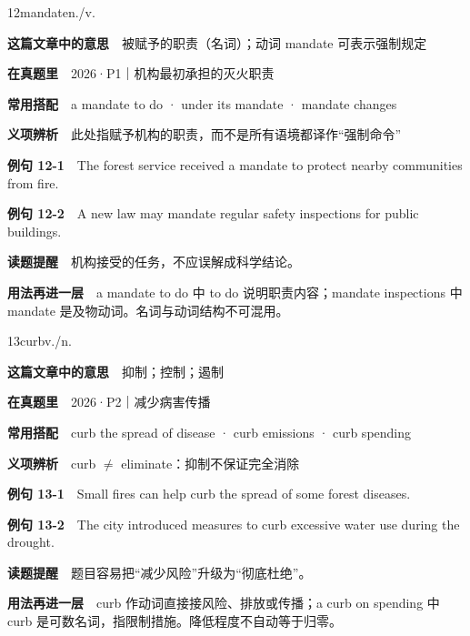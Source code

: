 \documentclass[a4paper,11pt,openany]{report}
\newcommand{\emphasislabel}[1]{\textcolor{leaf}{\CJKsf\bfseries #1}}
\begin{document}
\begin{vocabbox}{12}{mandate}{n./v.}

\textbf{这篇文章中的意思}　被赋予的职责（名词）；动词 mandate 可表示强制规定

\textbf{在真题里}　2026·P1｜机构最初承担的灭火职责

\textbf{常用搭配}　a mandate to do · under its mandate · mandate changes

\textbf{义项辨析}　此处指赋予机构的职责，而不是所有语境都译作``强制命令''

\textbf{例句 12-1}　The forest service received a mandate to protect nearby communities from fire.

\textbf{例句 12-2}　A new law may mandate regular safety inspections for public buildings.

\emphasislabel{读题提醒}　机构接受的任务，不应误解成科学结论。

\textbf{用法再进一层}　a mandate to do 中 to do 说明职责内容；mandate inspections 中 mandate 是及物动词。名词与动词结构不可混用。

\end{vocabbox}

\begin{vocabbox}{13}{curb}{v./n.}

\textbf{这篇文章中的意思}　抑制；控制；遏制

\textbf{在真题里}　2026·P2｜减少病害传播

\textbf{常用搭配}　curb the spread of disease · curb emissions · curb spending

\textbf{义项辨析}　curb \(\neq\) eliminate：抑制不保证完全消除

\textbf{例句 13-1}　Small fires can help curb the spread of some forest diseases.

\textbf{例句 13-2}　The city introduced measures to curb excessive water use during the drought.

\emphasislabel{读题提醒}　题目容易把``减少风险''升级为``彻底杜绝''。

\textbf{用法再进一层}　curb 作动词直接接风险、排放或传播；a curb on spending 中 curb 是可数名词，指限制措施。降低程度不自动等于归零。

\end{vocabbox}
\end{document}

